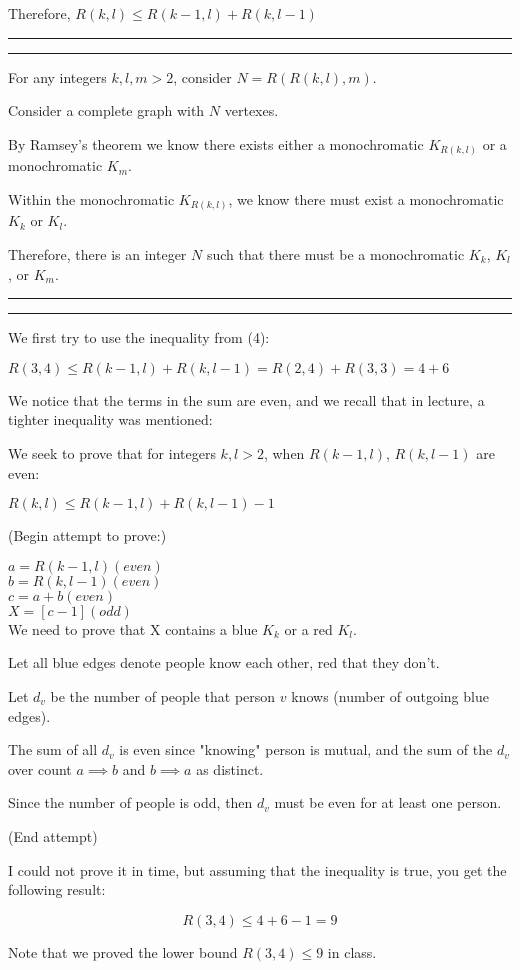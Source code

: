 \documentclass[11pt,letterpaper]{article}
\newcommand{\question}[1] {\vspace{.25in} \hrule\vspace{0.5em}
\noindent{\bf #1} \vspace{0.5em}
\hrule \vspace{.10in}}
\begin{document}
Therefore, $R(k, l) \leq R(k-1, l) + R(k, l-1)$

\question{5}
For any integers $k, l, m > 2$, consider $N = R(R(k,l), m)$.

Consider a complete graph with $N$ vertexes.

By Ramsey's theorem we know there exists either a monochromatic $K_{R(k,l)}$ or a monochromatic $K_{m}$.

Within the monochromatic $K_{R(k,l)}$, we know there must exist a monochromatic $K_{k}$ or $K_{l}$.

Therefore, there is an integer $N$ such that there must be a monochromatic $K_k$, $K_l$, or $K_m$.

\question{6}
We first try to use the inequality from (4):

$R(3, 4) \leq R(k-1, l) + R(k, l-1) = R(2, 4) + R(3, 3) = 4 + 6$


We notice that the terms in the sum are even, and we recall that in lecture, a tighter inequality was mentioned:

We seek to prove that for integers $k, l > 2$, when $R(k-1, l)$, $R(k, l-1)$ are even:

$R(k, l) \leq R(k-1, l) + R(k, l-1) - 1$

(Begin attempt to prove:)

$a = R(k-1, l)   (even)$\\
$b = R(k, l-1)   (even)$\\
$c = a + b       (even)$\\

$X = [c-1]       (odd)$\\

We need to prove that X contains a blue $K_k$ or a red $K_l$.

Let all blue edges denote people know each other, red that they don't.

Let $d_v$ be the number of people that person $v$ knows (number of outgoing blue edges).

The sum of all $d_v$ is even since "knowing" person is mutual, and the sum of the $d_v$ over count $a \implies b$ and $b \implies a$ as distinct.

Since the number of people is odd, then $d_v$ must be even for at least one person.

(End attempt)

I could not prove it in time, but assuming that the inequality is true, you get the following result:

$$R(3, 4) \leq 4 + 6 - 1 = 9$$

Note that we proved the lower bound $R(3,4) \leq 9$ in class.
\end{document}
